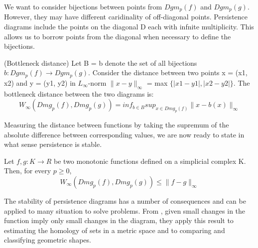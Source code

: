 We want to consider bijections between points from $Dgm_p(f)$ and $Dgm_p(g)$. However, they may have different caridinality of off-diagonal points. Persistence diagrams include the points on the diagonal D each with infnite multiplicity. This allows us to borrow points from the diagonal when necessary to define the bijections.
\begin{definition}(Bottleneck distance)
Let B = {b} denote the set of all bijections $b : Dgm_p( f ) \rightarrow Dgm_p(g)$. Consider the distance between two points x = (x1, x2) and y = (y1, y2) in $L_\infty$-norm $\lVert x-y \rVert _\infty$ = max $ \{ |x1-y1|, |x2-y2| \} $. The bottleneck distance between the two diagrams is:
\begin{equation*}
    W_\infty(Dmg_p(f), Dmg_p(g)) = inf_{b \in B} sup_{x \in Dmg_p(f)} \lVert x- b(x) \rVert_\infty
\end{equation*}
\end{definition}
Measuring the distance between functions by taking the supremum of the absolute difference between corresponding values, we are now ready to state in what sense persistence is stable.
\begin{theorem}
Let $f,g : K \rightarrow R$ be two monotonic functions defined on a simplicial complex K. Then, for every $p \geq 0$,
\begin{equation*}
    W_\infty(Dmg_p(f), Dmg_p(g)) \leq \lVert f - g \rVert_\infty
\end{equation*}
\end{theorem}
The stability of persistence diagrams has a number of consequences and can be applied to many situation to solve problems. From \cite{stability}, given small changes in the function imply only small changes in the diagram, they apply this result to estimating the homology of sets in a metric space and to comparing and classifying geometric shapes.